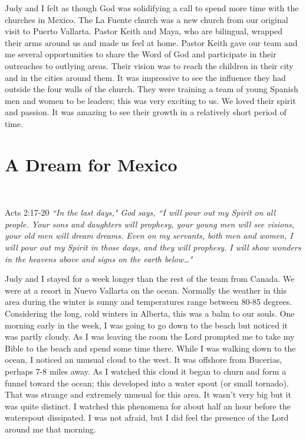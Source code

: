 \documentclass[oneside,12pt]{book}
\begin{document}
Judy and I felt as though God was solidifying a call to spend more time with the churches in Mexico. The La Fuente church was a new church from our original visit to Puerto Vallarta. Pastor Keith and Maya, who are bilingual, wrapped their arms around us and made us feel at home. Pastor Keith gave our team and me several opportunities to share the Word of God and participate in their outreaches to outlying areas. Their vision was to reach the children in their city and in the cities around them. It was impressive to see the influence they had outside the four walls of the church. They were training a team of young Spanish men and women to be leaders; this was very exciting to us. We loved their spirit and passion. It was amazing to see their growth in a relatively short period of time. 


\section{A Dream for Mexico}
\

Acts 2:17-20 \textit{``In the last days," God says, ``I will pour out my Spirit on all people. Your sons and daughters will prophesy, your young men will see visions, your old men will dream dreams. Even on my servants, both men and women, I will pour out my Spirit in those days, and they will prophesy. I will show wonders in the heavens above and signs on the earth below…"}

Judy and I stayed for a week longer than the rest of the team from Canada. We were  at a resort in Nuevo Vallarta on the ocean. Normally the weather in this area during the winter is sunny and temperatures range between 80-85 degrees. Considering the long, cold winters in Alberta, this was a balm to our souls. One morning early in the week, I was going to go down to the beach but noticed it was partly cloudy. As I was leaving the room the Lord prompted me to take my Bible to the beach and spend some time there. While I was walking down to the ocean, I noticed an unusual cloud to the west. It was offshore from Bucerias, perhaps 7-8 miles away. As I watched this cloud it began to churn and form a funnel toward the ocean; this developed into a water spout (or small tornado). That was strange and extremely unusual for this area. It wasn't very big but it was quite distinct. I watched this phenomena for about half an hour before the waterspout dissipated. I was not afraid, but I did feel the presence of the Lord around me that morning.
\end{document}

